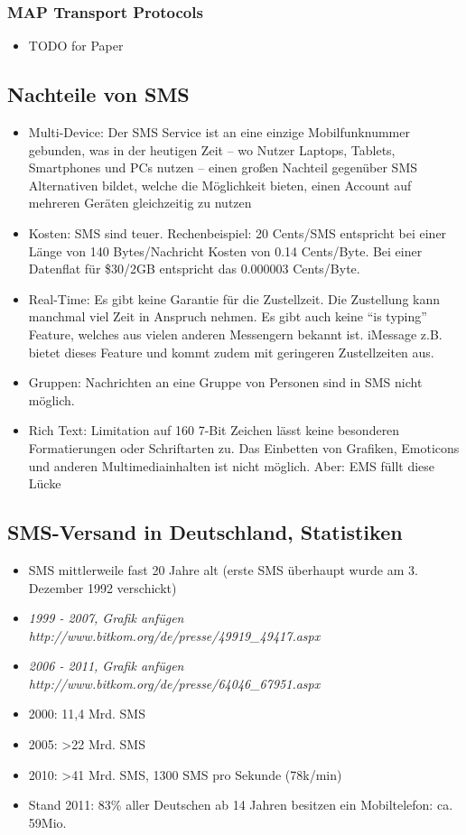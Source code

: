 \documentclass[german,12pt,a4paper]{article}
\begin{document}
\subsubsection{MAP Transport Protocols}
\begin{itemize}
	\item TODO for Paper
\end{itemize}

\subsection{Nachteile von SMS}
\begin{itemize}
	\item Multi-Device: Der SMS Service ist an eine einzige Mobilfunknummer gebunden, was in der heutigen Zeit -- 
		wo Nutzer Laptops, Tablets, Smartphones und PCs nutzen -- einen großen Nachteil gegenüber SMS Alternativen 
		bildet, welche die Möglichkeit bieten, einen Account auf mehreren Geräten gleichzeitig zu nutzen
	\item Kosten: SMS sind teuer. Rechenbeispiel: 20 Cents/SMS entspricht bei einer Länge von 140 Bytes/Nachricht Kosten 
		von 0.14 Cents/Byte. Bei einer Datenflat für \$30/2GB entspricht das 0.000003 Cents/Byte.
	\item Real-Time: Es gibt keine Garantie für die Zustellzeit. Die Zustellung kann manchmal viel Zeit in Anspruch nehmen. 
		Es gibt auch keine ``is typing'' Feature, welches aus vielen anderen Messengern bekannt ist. iMessage z.B. bietet 
		dieses Feature und kommt zudem mit geringeren Zustellzeiten aus.
	\item Gruppen: Nachrichten an eine Gruppe von Personen sind in SMS nicht möglich.
	\item Rich Text: Limitation auf 160 7-Bit Zeichen lässt keine besonderen Formatierungen oder Schriftarten zu. Das Einbetten
		von Grafiken, Emoticons und anderen Multimediainhalten ist nicht möglich. Aber: EMS füllt diese Lücke
\end{itemize}

\subsection{SMS-Versand in Deutschland, Statistiken}
\begin{itemize}
	\item SMS mittlerweile fast 20 Jahre alt (erste SMS überhaupt wurde am 3. Dezember 1992 verschickt)
	\item \textit{1999 - 2007, Grafik anfügen http://www.bitkom.org/de/presse/49919\_49417.aspx}
	\item \textit{2006 - 2011, Grafik anfügen http://www.bitkom.org/de/presse/64046\_67951.aspx}
	\item 2000: 11,4 Mrd. SMS
	\item 2005: \textgreater 22 Mrd. SMS
	\item 2010: \textgreater 41 Mrd. SMS, 1300 SMS pro Sekunde (78k/min)
	\item Stand 2011: 83\% aller Deutschen ab 14 Jahren besitzen ein Mobiltelefon: ca. 59Mio.
\end{itemize}
\end{document}
